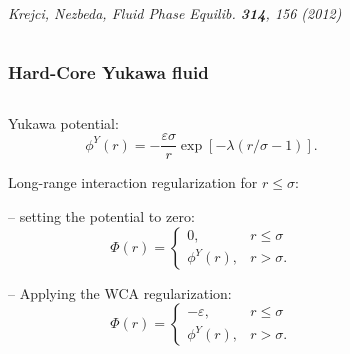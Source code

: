 \documentclass[8pt]{beamer}
\begin{document}
\begin{frame}
\begin{columns}
			[1] \textit{Krejci, Nezbeda, Fluid Phase Equilib. \textbf{314}, 156 (2012)}
			
		\end{columns}
		
		
	\end{frame}
	
	\begin{frame}
		\frametitle{Hard-Core Yukawa fluid}
		
		\begin{columns}
			\begin{column}{0.5\textwidth}
				Yukawa potential:
				\begin{equation*}
					\label{def:yukawa}
					\phi^Y(r) = -\frac{\varepsilon \sigma}{r} \exp[-\lambda(r/\sigma - 1)].
				\end{equation*}
				
				Long-range interaction regularization for $r \leq \sigma$:
				\hfill
				\\
				\hfill
				
				-- setting the potential to zero:
				\begin{equation*}
					\Phi(r) = \left\{
					\begin{array}{ll}
						0, & r \leq \sigma 
						\\
						\phi^Y(r), & r > \sigma.
					\end{array}
					\right.
				\end{equation*}
				
				-- Applying the WCA regularization:
				\begin{equation*}
					\Phi(r) = \left\{
					\begin{array}{ll}
						-\varepsilon, & r \leq \sigma 
						\\
						\phi^Y(r), & r > \sigma.
					\end{array}
					\right.
				\end{equation*}
			\end{column}
			
			\begin{column}{0.5\textwidth}
				

\end{column}
\end{columns}
\end{frame}
\end{document}
